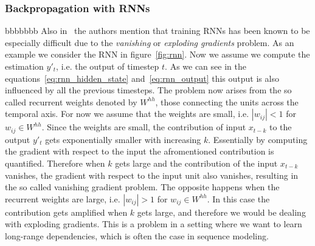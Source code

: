 \subsubsection{Backpropagation with RNNs}bbbbbbb
Also in~\cite{rnn_survey} the authors mention that training RNNs has been known to be especially difficult due to the \emph{vanishing} or \emph{exploding gradients} problem.
As an example we consider the RNN in figure~\ref{fig:rnn}.
Now we assume we compute the estimation $y'_t$, i.e. the output of timestep $t$.
As we can see in the equations~\ref{eq:rnn_hidden_state} and~\ref{eq:rnn_output} this output is also influenced by all the previous timesteps.
The problem now arises from the so called recurrent weights denoted by $W^{hh}$, those connecting the units across the temporal axis.
For now we assume that the weights are small, i.e. $|w_{ij}| < 1$ for $w_{ij} \in W^{hh}$.
Since the weights are small, the contribution of input $x_{t-k}$ to the output $y'_t$ gets exponentially smaller with increasing $k$.
Essentially by computing the gradient with respect to the input the afromentioned contribution is quantified.
Therefore when $k$ gets large and the contribution of the input $x_{t-k}$ vanishes, the gradient with respect to the input unit also vanishes, resulting in the so called vanishing gradient problem.
The opposite happens when the recurrent weights are large, i.e. $|w_{ij}| > 1$ for $w_{ij} \in W^{hh}$.
In this case the contribution gets amplified when $k$ gets large, and therefore we would be dealing with exploding gradients.
This is a problem in a setting where we want to learn long-range dependencies, which is often the case in sequence modeling.


